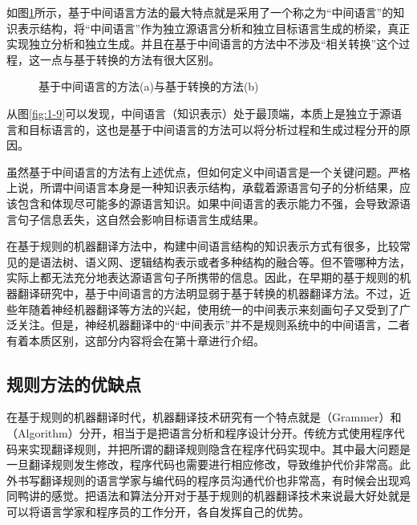 \parinterval 如图\ref{fig:1-12}所示，基于中间语言方法的最大特点就是采用了一个称之为“中间语言”的知识表示结构，将“中间语言”作为独立源语言分析和独立目标语言生成的桥梁，真正实现独立分析和独立生成。并且在基于中间语言的方法中不涉及“相关转换”这个过程，这一点与基于转换的方法有很大区别。

\begin{figure}[htp]
    \centering

    \caption{基于中间语言的方法(a)与基于转换的方法(b)}
    \label{fig:1-12}
\end{figure}

\parinterval 从图\ref{fig:1-9}可以发现，中间语言（知识表示）处于最顶端，本质上是独立于源语言和目标语言的，这也是基于中间语言的方法可以将分析过程和生成过程分开的原因。

\parinterval 虽然基于中间语言的方法有上述优点，但如何定义中间语言是一个关键问题。严格上说，所谓中间语言本身是一种知识表示结构，承载着源语言句子的分析结果，应该包含和体现尽可能多的源语言知识。如果中间语言的表示能力不强，会导致源语言句子信息丢失，这自然会影响目标语言生成结果。

\parinterval 在基于规则的机器翻译方法中，构建中间语言结构的知识表示方式有很多，比较常见的是语法树、语义网、逻辑结构表示或者多种结构的融合等。但不管哪种方法，实际上都无法充分地表达源语言句子所携带的信息。因此，在早期的基于规则的机器翻译研究中，基于中间语言的方法明显弱于基于转换的机器翻译方法。不过，近些年随着神经机器翻译等方法的兴起，使用统一的中间表示来刻画句子又受到了广泛关注。但是，神经机器翻译中的“中间表示”并不是规则系统中的中间语言，二者有着本质区别，这部分内容将会在第十章进行介绍。


\subsection{规则方法的优缺点}

\parinterval 在基于规则的机器翻译时代，机器翻译技术研究有一个特点就是{\small{}}（Grammer）和{\small{}}（Algorithm）分开，相当于是把语言分析和程序设计分开。传统方式使用程序代码来实现翻译规则，并把所谓的翻译规则隐含在程序代码实现中。其中最大问题是一旦翻译规则发生修改，程序代码也需要进行相应修改，导致维护代价非常高。此外书写翻译规则的语言学家与编代码的程序员沟通代价也非常高，有时候会出现鸡同鸭讲的感觉。把语法和算法分开对于基于规则的机器翻译技术来说最大好处就是可以将语言学家和程序员的工作分开，各自发挥自己的优势。

